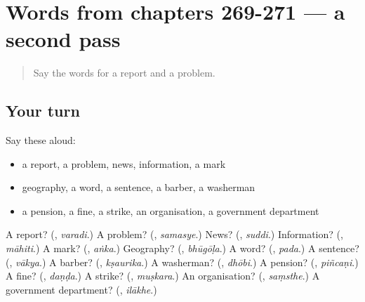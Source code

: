 \section[(dialogue)]{Words from chapters 269-271 — a second pass}

\label{lesson:KA-R271-second-pass-words-from-chapters-269-271}



\begin{quote}
Say the words for a report and a problem.
\end{quote}

\subsection*{Your turn}
Say these aloud:

\begin{itemize}
\raggedright
  \item a report, a problem, news, information, a mark
  \item geography, a word, a sentence, a barber, a washerman
  \item a pension, a fine, a strike, an organisation, a government department
\end{itemize}

\begin{tcolorbox}[breakable,colback=teal!4,colframe=teal!35!black,title={Before you move on}]
A report? (\textbf{}, \emph{varadi}.) A problem? (\textbf{}, \emph{samasye}.) News? (\textbf{}, \emph{suddi}.) Information? (\textbf{}, \emph{māhiti}.) A mark? (\textbf{}, \emph{aṅka}.) Geography? (\textbf{}, \emph{bhūgōḷa}.) A word? (\textbf{}, \emph{pada}.) A sentence? (\textbf{}, \emph{vākya}.) A barber? (\textbf{}, \emph{kṣaurika}.) A washerman? (\textbf{}, \emph{dhōbi}.) A pension? (\textbf{}, \emph{piñcaṇi}.) A fine? (\textbf{}, \emph{daṇḍa}.) A strike? (\textbf{}, \emph{muṣkara}.) An organisation? (\textbf{}, \emph{saṃsthe}.) A government department? (\textbf{}, \emph{ilākhe}.)
\end{tcolorbox}
